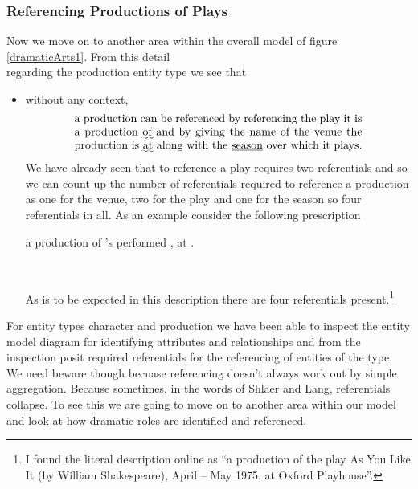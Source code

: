 \subsubsection{Referencing Productions of Plays}
Now we move on to another area within the overall model of figure \ref{dramaticArts1}. From this detail 
\begin{equation*}

\end{equation*}
regarding the production entity type  we see that
\begin{itemize}
  \item
  without any context, 
  \begin{equation} 
\label{absoluteCharacterReferencing}
\text{\parbox{9cm}{a production can be referenced by referencing the play it is a production \uwave{of} 
  and by giving the \underline{name} of the venue  the production is \uwave{at} along with the \underline{season} 
  over which it plays.}}
\end{equation}
We have already seen that to reference a play requires two referentials and so
we can count up the number of referentials required to reference a production
  as one for the venue, two for the play and one for the season so four referentials in all. 
As an example consider the following prescription
\begin{erquote}
\parbox{9cm}{a production of \mbox{'s} 
 performed \mbox{,} at .}\\
\end{erquote}
As is to be expected in this description there are four referentials present.\footnote{
I found the literal description online as ``a production of the play As You Like It (by William Shakespeare), April – May 1975, at Oxford Playhouse''.  
} 
\end{itemize}
For entity types character and production we have been able to inspect the entity model diagram for identifying  attributes and relationships and from the inspection posit required referentials  for the referencing of entities of the type.
We need beware though becuase referencing doesn't always work out by simple aggregation. Because sometimes,
in the words of Shlaer and Lang, referentials collapse. 
To see this we are going to move on to another area within our model and look at how dramatic roles are identified and referenced.

